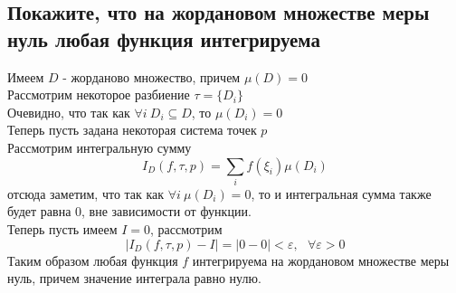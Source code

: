 
\subsection{Покажите, что на жордановом множестве меры нуль любая функция интегрируема}

Имеем $D$ - жорданово множество, причем $\mu(D) = 0$ \\
Рассмотрим некоторое разбиение $\tau = \{D_i\}$ \\
Очевидно, что так как $\forall i \ D_i \subseteq D$, то $\mu(D_i) = 0$ \\
Теперь пусть задана некоторая система точек $p$ \\
Рассмотрим интегральную сумму
\[I_D(f, \tau, p) = \sum\limits_if(\xi_i)\mu(D_i)\]
отсюда заметим, что так как $\forall i \ \mu(D_i) = 0$, то и интегральная сумма также будет равна 0, вне зависимости от функции. \\
Теперь пусть имеем $I = 0$, рассмотрим 
\[|I_D(f, \tau, p) - I| = |0 - 0| < \varepsilon, \ \ \ \forall \varepsilon > 0\]
Таким образом любая функция $f$ интегрируема на жордановом множестве меры нуль, причем значение интеграла равно нулю.


